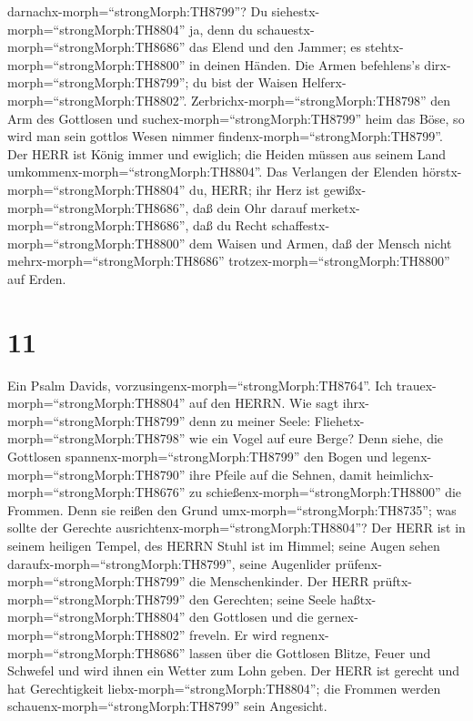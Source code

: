 darnachx-morph=``strongMorph:TH8799''?  Du
siehestx-morph=``strongMorph:TH8804'' ja, denn du
schauestx-morph=``strongMorph:TH8686'' das Elend und den Jammer; es
stehtx-morph=``strongMorph:TH8800'' in deinen Händen. Die Armen
befehlens's dirx-morph=``strongMorph:TH8799''; du bist der Waisen
Helferx-morph=``strongMorph:TH8802''. 
Zerbrichx-morph=``strongMorph:TH8798'' den Arm des Gottlosen und
suchex-morph=``strongMorph:TH8799'' heim das Böse, so wird man sein
gottlos Wesen nimmer findenx-morph=``strongMorph:TH8799''. 
Der HERR ist König immer und ewiglich; die Heiden müssen aus seinem Land
umkommenx-morph=``strongMorph:TH8804''.  Das Verlangen der
Elenden hörstx-morph=``strongMorph:TH8804'' du, HERR; ihr Herz ist
gewißx-morph=``strongMorph:TH8686'', daß dein Ohr darauf
merketx-morph=``strongMorph:TH8686'',  daß du Recht
schaffestx-morph=``strongMorph:TH8800'' dem Waisen und Armen, daß der
Mensch nicht mehrx-morph=``strongMorph:TH8686''
trotzex-morph=``strongMorph:TH8800'' auf Erden.

\hypertarget{section-10}{%
\section{11}\label{section-10}}

 Ein Psalm Davids,
vorzusingenx-morph=``strongMorph:TH8764''. Ich
trauex-morph=``strongMorph:TH8804'' auf den HERRN. Wie sagt
ihrx-morph=``strongMorph:TH8799'' denn zu meiner Seele:
Fliehetx-morph=``strongMorph:TH8798'' wie ein Vogel auf eure Berge?
 Denn siehe, die Gottlosen
spannenx-morph=``strongMorph:TH8799'' den Bogen und
legenx-morph=``strongMorph:TH8790'' ihre Pfeile auf die Sehnen, damit
heimlichx-morph=``strongMorph:TH8676'' zu
schießenx-morph=``strongMorph:TH8800'' die Frommen.  Denn
sie reißen den Grund umx-morph=``strongMorph:TH8735''; was sollte der
Gerechte ausrichtenx-morph=``strongMorph:TH8804''?  Der HERR
ist in seinem heiligen Tempel, des HERRN Stuhl ist im Himmel; seine
Augen sehen daraufx-morph=``strongMorph:TH8799'', seine Augenlider
prüfenx-morph=``strongMorph:TH8799'' die Menschenkinder. 
Der HERR prüftx-morph=``strongMorph:TH8799'' den Gerechten; seine Seele
haßtx-morph=``strongMorph:TH8804'' den Gottlosen und die
gernex-morph=``strongMorph:TH8802'' freveln.  Er wird
regnenx-morph=``strongMorph:TH8686'' lassen über die Gottlosen Blitze,
Feuer und Schwefel und wird ihnen ein Wetter zum Lohn geben.
 Der HERR ist gerecht und hat Gerechtigkeit
liebx-morph=``strongMorph:TH8804''; die Frommen werden
schauenx-morph=``strongMorph:TH8799'' sein Angesicht.

